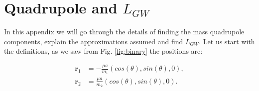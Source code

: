 
\chapter{Quadrupole and $L_{GW}$}\label{ap:L_GW}

In this appendix we will go through the details of finding the mass quadrupole components, explain the approximations assumed and find $L_{GW}$.
Let us start with the definitions, as we saw from Fig. \ref{fig:binary} the positions are:

\begin{align}
    \textbf{r}_1 &= -\frac{\mu a}{m_1}(cos(\theta),sin(\theta),0),\\
    \textbf{r}_2 &= \frac{\mu a}{m_2}(cos(\theta),sin(\theta),0).\\
\end{align}

